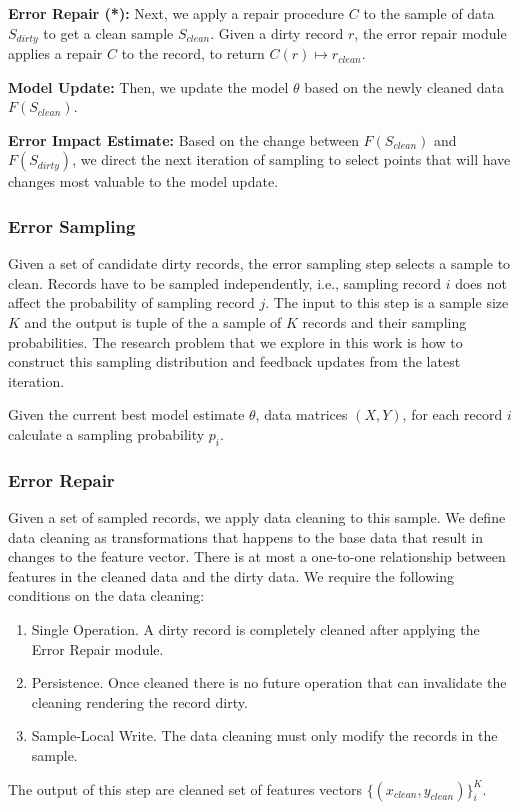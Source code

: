 \noindent\textbf{Error Repair (*): } Next, we apply a repair procedure $C$ to the sample of data $S_{dirty}$ to get a clean sample $S_{clean}$. Given a dirty record $r$, the error repair module applies a repair $C$ to the record, to return $C(r)\mapsto r_{clean}$. 

\vspace{0.5em}

\noindent\textbf{Model Update: } Then, we update the model $\theta$ based on the newly cleaned data $F(S_{clean})$.

\vspace{0.5em}

\noindent\textbf{Error Impact Estimate: } Based on the change between $F(S_{clean})$ and $F(S_{dirty})$, we direct the next iteration of sampling to select points that will have changes most valuable to the model update.

\iffalse


\subsubsection{Error Sampling}
Given a set of candidate dirty records, the error sampling step selects a sample to clean.
Records have to be sampled independently, i.e., sampling record $i$ does not affect the probability of sampling record $j$.
The input to this step is a sample size $K$ and the output is tuple of the a sample of $K$ records and their sampling probabilities.
The research problem that we explore in this work is how to construct this sampling distribution and feedback updates from the latest iteration.

\begin{problem}\label{imp-samp}\sloppy
Given the current best model estimate $\theta$, data matrices $(X,Y)$, for each record $i$ calculate a sampling probability $p_i$.
\end{problem}

\subsubsection{Error Repair}
Given a set of sampled records, we apply data cleaning to this sample.
We define data cleaning as transformations that happens to the base data that result in changes to the feature vector. 
There is at most a one-to-one relationship between features in the cleaned data and the dirty data.
We require the following conditions on the data cleaning:
\begin{enumerate}
\item Single Operation. A dirty record is completely cleaned after applying the Error Repair module.
\item Persistence. Once cleaned there is no future operation that can invalidate the cleaning rendering the record dirty.
\item Sample-Local Write. The data cleaning must only modify the records in the sample.
\end{enumerate}
The output of this step are cleaned set of features vectors $\{(x_{clean},y_{clean})\}^K_i$.

